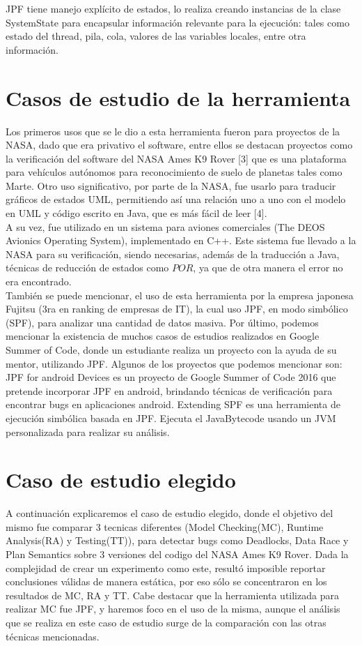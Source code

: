 \documentclass[runningheads]{llncs}
\begin{document}
JPF tiene manejo expl\'icito de estados, lo realiza creando instancias de la clase SystemState para encapsular informaci\'on relevante para la ejecuci\'on: tales como estado del thread, pila, cola, valores de las variables locales, entre otra informaci\'on.


\section{Casos de estudio de la herramienta}

Los primeros usos que se le dio a esta herramienta fueron para proyectos de la NASA, dado que era privativo el software, entre ellos se destacan proyectos como la verificaci\'on del software del NASA Ames K9 Rover [3] que es una plataforma para veh\'iculos aut\'onomos para reconocimiento de suelo de planetas tales como Marte.
Otro uso significativo, por parte de la NASA, fue usarlo para traducir gr\'aficos de estados UML, permitiendo as\'i una relaci\'on uno a uno con el modelo en UML y c\'odigo escrito en Java, que es m\'as fácil de leer [4].\\
A su vez, fue utilizado en un sistema para aviones comerciales (The DEOS Avionics Operating System), implementado en C++. Este sistema fue llevado a la NASA para su verificaci\'on, siendo necesarias, adem\'as de la traducci\'on a Java, t\'ecnicas de reducci\'on de estados como $POR$, ya que de otra manera el error no era encontrado.\\
Tambi\'en se puede mencionar, el uso de esta herramienta por la empresa japonesa Fujitsu (3ra en ranking de empresas de IT), la cual uso JPF, en modo simb\'olico (SPF), para analizar una cantidad de datos masiva.
Por \'ultimo, podemos mencionar la existencia de muchos casos de estudios realizados en Google Summer of Code, donde un estudiante realiza un proyecto con la ayuda de su mentor, utilizando JPF. Algunos de los proyectos que podemos mencionar son: 
JPF for android Devices es un proyecto de Google Summer of Code 2016 que pretende incorporar JPF en android, brindando t\'ecnicas de verificaci\'on para encontrar bugs en aplicaciones android.
Extending SPF es una herramienta de ejecuci\'on simb\'olica basada en JPF. Ejecuta el JavaBytecode usando un JVM personalizada para realizar su an\'alisis.


\section{Caso de estudio elegido}
A continuaci\'on explicaremos el caso de estudio elegido, donde el objetivo del mismo fue comparar 3 tecnicas diferentes (Model Checking(MC), Runtime Analysis(RA) y Testing(TT)), para detectar bugs como Deadlocks, Data Race y Plan Semantics sobre 3 versiones del codigo del NASA Ames K9 Rover.
Dada la complejidad de crear un experimento como este, result\'o imposible reportar conclusiones v\'alidas de manera est\'atica, por eso s\'olo se concentraron en los resultados de MC, RA y TT. Cabe destacar que la herramienta utilizada para realizar MC fue JPF, y haremos foco en el uso de la misma, aunque el an\'alisis que se realiza en este caso de estudio surge de la comparaci\'on con las otras t\'ecnicas mencionadas.
\end{document}
